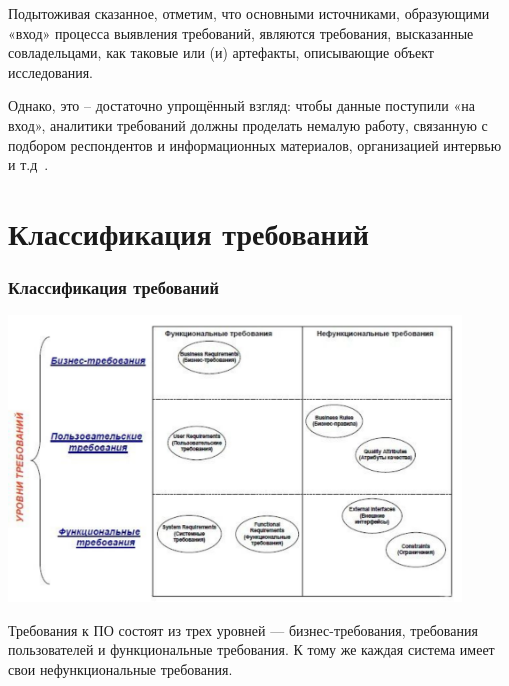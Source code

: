 \documentclass{../industrial-development}
\begin{document}
Подытоживая сказанное, отметим, что основными источниками, образующими «вход» процесса выявления требований, являются требования, высказанные совладельцами, как таковые или (и) артефакты, описывающие объект исследования.

Однако, это – достаточно упрощённый взгляд: чтобы данные поступили «на вход», аналитики требований должны проделать немалую работу, связанную с подбором респондентов и информационных материалов, организацией интервью и т.д~\cite[с.~29--30]{Maglinec}.

\section{Классификация требований}
\begin{frame} \frametitle{Классификация требований}
 \centerline{\includegraphics[width=0.9\textwidth]{pict1.pdf}}
\end{frame}

\lecturenotes

Требования к ПО состоят из трех уровней —
бизнес-требования, требования пользователей и функциональные требования. К тому же каждая система имеет свои нефункциональные требования.

\end{document}

